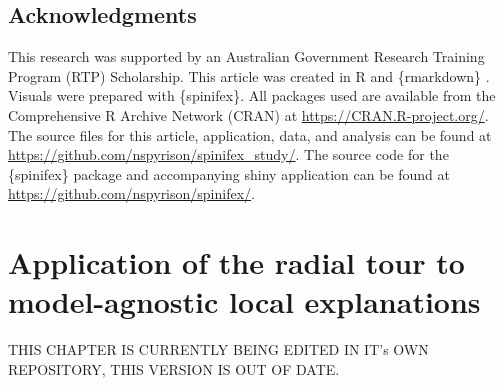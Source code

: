 \documentclass{template/monashthesis}
\begin{document}
\begin{Shaded}
\begin{Highlighting}[]
\NormalTok{(}\NormalTok{, } \NormalTok{)}
\SpecialCharTok{::}\NormalTok{(}\NormalTok{)}
\end{Highlighting}
\end{Shaded}

\hypertarget{sec:acknowledgments}{%
\section{Acknowledgments}\label{sec:acknowledgments}}

This research was supported by an Australian Government Research Training Program (RTP) Scholarship. This article was created in R \autocite{r_core_team_r:_2020} and \{rmarkdown\} \autocite{xie_r_2018}. Visuals were prepared with \{spinifex\}. All packages used are available from the Comprehensive R Archive Network (CRAN) at \url{https://CRAN.R-project.org/}. The source files for this article, application, data, and analysis can be found at \url{https://github.com/nspyrison/spinifex_study/}. The source code for the \{spinifex\} package and accompanying shiny application can be found at \url{https://github.com/nspyrison/spinifex/}.

\hypertarget{ch:cheem}{%
\chapter{Application of the radial tour to model-agnostic local explanations}\label{ch:cheem}}

THIS CHAPTER IS CURRENTLY BEING EDITED IN IT's OWN REPOSITORY, THIS VERSION IS OUT OF DATE.

\begin{Shaded}
\begin{Highlighting}[]
\SpecialCharTok{::}\SpecialCharTok{$}\NormalTok{(}
   \DocumentationTok{\#\#\# }
   \NormalTok{)}

\end{Highlighting}
\end{Shaded}
\end{document}
